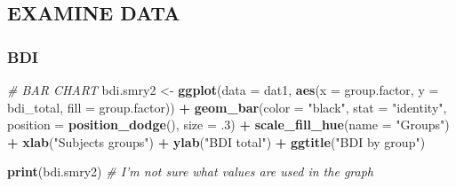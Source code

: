 \documentclass[]{article}
\newenvironment{Shaded}{\begin{snugshade}}{\end{snugshade}}
\newcommand{\KeywordTok}[1]{\textcolor[rgb]{0.13,0.29,0.53}{\textbf{#1}}}
\newcommand{\DataTypeTok}[1]{\textcolor[rgb]{0.13,0.29,0.53}{#1}}
\newcommand{\DecValTok}[1]{\textcolor[rgb]{0.00,0.00,0.81}{#1}}
\newcommand{\StringTok}[1]{\textcolor[rgb]{0.31,0.60,0.02}{#1}}
\newcommand{\CommentTok}[1]{\textcolor[rgb]{0.56,0.35,0.01}{\textit{#1}}}
\newcommand{\OtherTok}[1]{\textcolor[rgb]{0.56,0.35,0.01}{#1}}
\newcommand{\OperatorTok}[1]{\textcolor[rgb]{0.81,0.36,0.00}{\textbf{#1}}}
\newcommand{\NormalTok}[1]{#1}
\begin{document}
\subsection{EXAMINE DATA}\label{examine-data}

\subsubsection{BDI}\label{bdi}

\begin{Shaded}
\end{Shaded}

\begin{Shaded}
\begin{Highlighting}[]
\CommentTok{#       BAR CHART}
\NormalTok{bdi.smry2  <-}\StringTok{ }\KeywordTok{ggplot}\NormalTok{(}\DataTypeTok{data =}\NormalTok{ dat1,}
                       \KeywordTok{aes}\NormalTok{(}\DataTypeTok{x =}\NormalTok{ group.factor,}
                        \DataTypeTok{y =}\NormalTok{ bdi_total,}
                        \DataTypeTok{fill =}\NormalTok{ group.factor)) }\OperatorTok{+}
\StringTok{    }\KeywordTok{geom_bar}\NormalTok{(}\DataTypeTok{color =} \StringTok{"black"}\NormalTok{, }\DataTypeTok{stat =} \StringTok{"identity"}\NormalTok{,}
             \DataTypeTok{position =} \KeywordTok{position_dodge}\NormalTok{(),}
             \DataTypeTok{size =}\NormalTok{ .}\DecValTok{3}\NormalTok{) }\OperatorTok{+}
\StringTok{    }\KeywordTok{scale_fill_hue}\NormalTok{(}\DataTypeTok{name =} \StringTok{"Groups"}\NormalTok{) }\OperatorTok{+}
\StringTok{    }\KeywordTok{xlab}\NormalTok{(}\StringTok{"Subjects groups"}\NormalTok{) }\OperatorTok{+}
\StringTok{    }\KeywordTok{ylab}\NormalTok{(}\StringTok{"BDI total"}\NormalTok{) }\OperatorTok{+}
\StringTok{    }\KeywordTok{ggtitle}\NormalTok{(}\StringTok{"BDI by group"}\NormalTok{)}

\KeywordTok{print}\NormalTok{(bdi.smry2) }\CommentTok{# I'm not sure what values are used in the graph}
\end{Highlighting}
\end{Shaded}
\end{document}
